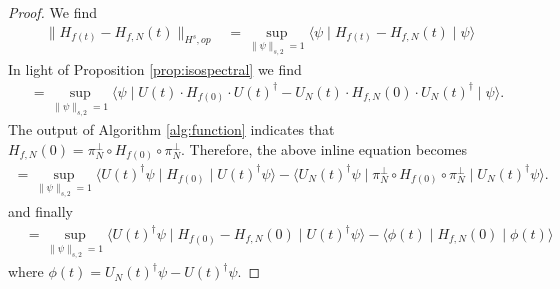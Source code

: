 \documentclass[final,leqno]{siamart}
\begin{document}
\begin{proof}
	We find
	\begin{align*}
		\| H_{f(t)} - H_{f,N}(t) \|_{H^{s},op} &= \sup_{\| \psi \|_{s,2} =1} \langle \psi \mid H_{f(t)} - H_{f,N}(t) \mid \psi \rangle
	\end{align*}
	In light of Proposition \ref{prop:isospectral} we find
	\begin{align*}
			\quad = \sup_{ \| \psi \|_{s,2} =1} \langle \psi \mid U(t) \cdot H_{f(0)} \cdot U(t)^{\dagger} - U_{N}(t) \cdot H_{f,N}(0) \cdot U_{N}(t)^{\dagger} \mid \psi \rangle.
	\end{align*}
	The output of Algorithm \ref{alg:function} indicates that $H_{f,N}(0) = \pi_{N}^{\perp} \circ H_{f(0)} \circ \pi_{N}^{\perp}$.
	Therefore, the above inline equation becomes
	\begin{align*}
			= \sup_{ \| \psi \|_{s,2} =1 } \langle U(t)^{\dagger} \psi \mid H_{f(0)} \mid U(t)^{\dagger} \psi \rangle
				- \langle U_{N}(t)^{\dagger} \psi \mid \pi_{N}^{\perp} \circ H_{f(0)} \circ \pi_{N}^{\perp} \mid U_{N}(t)^{\dagger} \psi \rangle.
	\end{align*}
	and finally
	\begin{align}
			&= \sup_{ \| \psi \|_{s,2} = 1} \langle U(t)^{\dagger} \psi \mid H_{f(0)} - H_{f,N}(0) \mid U(t)^{\dagger} \psi \rangle 
			- \langle  \phi(t) \mid H_{f,N}(0) \mid  \phi(t) \rangle \label{eq:final line}
	\end{align}
	where $\phi(t) = U_{N}(t)^{\dagger} \psi - U(t)^{\dagger} \psi$.
	

\end{proof}
\end{document}
